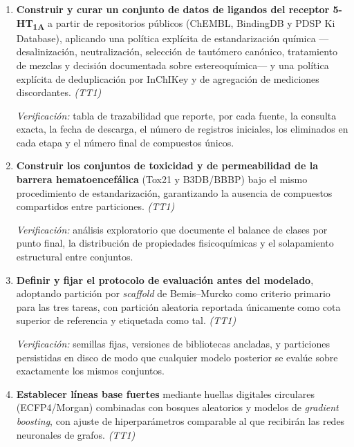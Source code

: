 \begin{enumerate}

  \item \textbf{Construir y curar un conjunto de datos de ligandos del receptor
        5-HT\textsubscript{1A}} a partir de repositorios públicos (ChEMBL,
        BindingDB y PDSP Ki Database), aplicando una política explícita de
        estandarización química —desalinización, neutralización, selección de
        tautómero canónico, tratamiento de mezclas y decisión documentada sobre
        estereoquímica— y una política explícita de deduplicación por InChIKey
        y de agregación de mediciones discordantes. \hfill \textit{(TT1)}

        \textit{Verificación:} tabla de trazabilidad que reporte, por cada
        fuente, la consulta exacta, la fecha de descarga, el número de registros
        iniciales, los eliminados en cada etapa y el número final de compuestos
        únicos.

  \item \textbf{Construir los conjuntos de toxicidad y de permeabilidad de la
        barrera hematoencefálica} (Tox21 y B3DB/BBBP) bajo el mismo
        procedimiento de estandarización, garantizando la ausencia de
        compuestos compartidos entre particiones. \hfill \textit{(TT1)}

        \textit{Verificación:} análisis exploratorio que documente el balance de
        clases por punto final, la distribución de propiedades fisicoquímicas y
        el solapamiento estructural entre conjuntos.

  \item \textbf{Definir y fijar el protocolo de evaluación antes del modelado},
        adoptando partición por \textit{scaffold} de Bemis--Murcko como criterio
        primario para las tres tareas, con partición aleatoria reportada
        únicamente como cota superior de referencia y etiquetada como tal.
        \hfill \textit{(TT1)}

        \textit{Verificación:} semillas fijas, versiones de bibliotecas
        ancladas, y particiones persistidas en disco de modo que cualquier
        modelo posterior se evalúe sobre exactamente los mismos conjuntos.

  \item \textbf{Establecer líneas base fuertes} mediante huellas digitales
        circulares (ECFP4/Morgan) combinadas con bosques aleatorios y modelos de
        \textit{gradient boosting}, con ajuste de hiperparámetros comparable al
        que recibirán las redes neuronales de grafos. \hfill \textit{(TT1)}


\end{enumerate}
